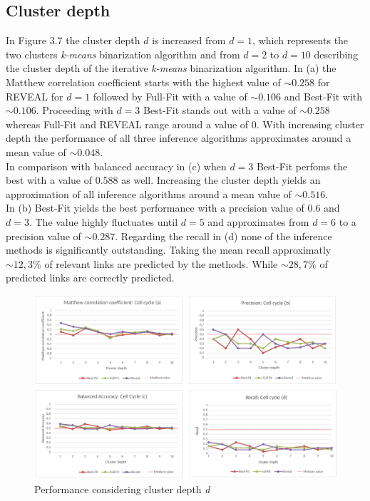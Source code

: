\subsection*{Cluster depth}
In Figure 3.7 the cluster depth $d$ is increased from $d=1$, which represents the two clusters \textit{k-means} binarization algorithm and from $d=2$ to $d=10$ describing the cluster depth of the iterative \textit{k-means} binarization algorithm. In (a) the Matthew correlation coefficient starts with the highest value of $\sim 0.258$ for REVEAL for $d=1$ followed by Full-Fit with a value of $\sim 0.106$ and Best-Fit with $\sim 0.106$. Proceeding with $d=3$ Best-Fit stands out with a value of $\sim 0.258$ whereas Full-Fit and REVEAL range around a value of $0$. With increasing cluster depth the performance of all three inference algorithms approximates around a mean value of $\sim 0.048$.\\
In comparison with balanced accuracy in (c) when $d=3$ Best-Fit perfoms the best with a value of $0.588$ as well. Increasing the cluster depth yields an approximation of all inference algorithms around a mean value of $\sim 0.516$.\\
In (b) Best-Fit yields the best performance with a precision value of $0.6$ and  $d=3$. The value highly fluctuates until $d=5$ and approximates from $d=6$ to a precision value of $\sim 0.287$. Regarding the recall in (d) none of the inference methods is significantly outstanding. Taking the mean recall approximatly $\sim 12,3\% $ of relevant links are predicted by the methods. While $\sim 28,7\% $ of predicted links are correctly predicted.


\begin{figure}[H]
\captionsetup{width=1.0\linewidth}
\centering
\includegraphics[width=1.0\textwidth]{./Bilder/Scoring/insilico/3_cellcycle_clusterdepth/insilico3.pdf}
\caption[Performance considering cluster depth \textit{d}]{Performance considering cluster depth \textit{d}}
\label{fig:7}
\end{figure}

